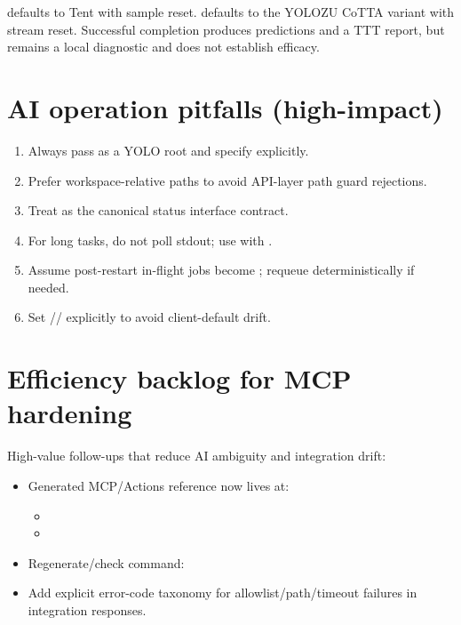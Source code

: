  defaults to Tent with sample reset.
 defaults to the YOLOZU CoTTA variant with stream reset.
Successful completion produces predictions and a TTT report, but remains a
local diagnostic and does not establish efficacy.

\section{AI operation pitfalls (high-impact)}

\begin{enumerate}
  \item Always pass  as a YOLO root and specify  explicitly.
  \item Prefer workspace-relative paths to avoid API-layer path guard rejections.
  \item Treat  as the canonical status interface contract.
  \item For long tasks, do not poll stdout; use  with .
  \item Assume post-restart in-flight jobs become ; requeue deterministically if needed.
  \item Set // explicitly to avoid client-default drift.
\end{enumerate}

\section{Efficiency backlog for MCP hardening}

High-value follow-ups that reduce AI ambiguity and integration drift:
\begin{itemize}
  \item Generated MCP/Actions reference now lives at:
  \begin{itemize}
    \item {}
    \item {}
  \end{itemize}
  \item Regenerate/check command: 
  \item Add explicit error-code taxonomy for allowlist/path/timeout failures in integration responses.
\end{itemize}

